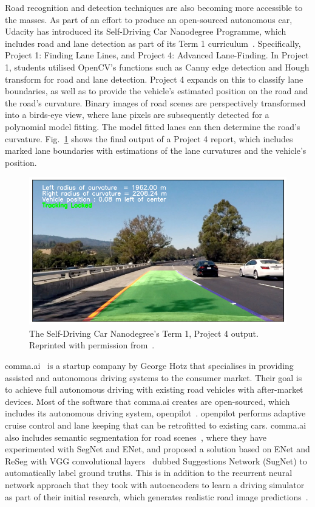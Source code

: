 Road recognition and detection techniques are also becoming more accessible to the masses. As part of an effort to produce an open-sourced autonomous car, Udacity has introduced its Self-Driving Car Nanodegree Programme, which includes road and lane detection as part of its Term 1 curriculum~\cite{udacity_self-driving_2017}. Specifically, Project 1: Finding Lane Lines, and Project 4: Advanced Lane-Finding. In Project 1, students utilised OpenCV's functions such as Canny edge detection and Hough transform for road and lane detection. Project 4 expands on this to classify lane boundaries, as well as to provide the vehicle's estimated position on the road and the road's curvature. Binary images of road scenes are perspectively transformed into a birds-eye view, where lane pixels are subsequently detected for a polynomial model fitting. The model fitted lanes can then determine the road's curvature. Fig.~\ref{figudacity} shows the final output of a Project 4 report, which includes marked lane boundaries with estimations of the lane curvatures and the vehicle's position.

\begin{figure}[H]
	\centering
	\includegraphics[width=0.7\linewidth]{udacity}
	\caption[Self-Driving Car Nanodegree output]{The Self-Driving Car Nanodegree's Term 1, Project 4 output. Reprinted with permission from~\cite{anthony_github_2017}.}
	\label{figudacity}
\end{figure}

comma.ai~\cite{comma._ai_comma.ai_2017} is a startup company by George Hotz that specialises in providing assisted and autonomous driving systems to the consumer market. Their goal is to achieve full autonomous driving with existing road vehicles with after-market devices. Most of the software that comma.ai creates are open-sourced, which includes its autonomous driving system, openpilot~\cite{comma._ai_openpilot_2017}. openpilot performs adaptive cruise control and lane keeping that can be retrofitted to existing cars. comma.ai also includes semantic segmentation for road scenes~\cite{comma.ai_self_2016}, where they have experimented with SegNet and ENet, and proposed a solution based on ENet and ReSeg with VGG convolutional layers~\cite{visin_reseg:_2016} dubbed Suggestions Network (SugNet) to automatically label ground truths. This is in addition to the recurrent neural network approach that they took with autoencoders to learn a driving simulator as part of their initial research, which generates realistic road image predictions~\cite{santana_learning_2016}. 

